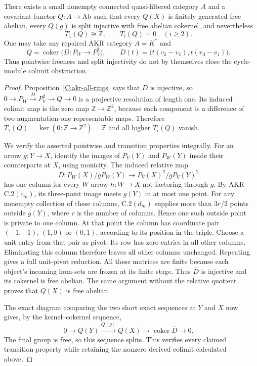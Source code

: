 \begin{proposition}\label{C:split-monic-counterexample}
There exists a small nonempty connected quasi-filtered category $A$
and a covariant functor $Q:A\to\mathrm{Ab}$ such that every $Q(X)$ is
finitely generated free abelian, every $Q(g)$ is split injective with
free abelian cokernel, and nevertheless
\[
 T_1(Q)\cong\mathbb Z,\qquad T_i(Q)=0\quad(i\geq2).
\]
One may take any repaired AKR category $A=K^*$ and
\[
 Q=\operatorname{coker}\bigl(D:P_W\longrightarrow P_V^2\bigr),
 \qquad D(t)=\bigl(t(v_2-v_1),t(v_3-v_1)\bigr).
\]
Thus pointwise freeness and split injectivity do not by themselves
close the cycle-module colimit obstruction.
\end{proposition}
\begin{proof}
Proposition~\ref{C:akr-all-rings} says that $D$ is injective, so
$0\to P_W\xrightarrow D P_V^2\to Q\to0$ is a projective resolution
of length one. Its induced colimit map is the zero map
$\mathbb Z\to\mathbb Z^2$, because each component is a difference
of two augmentation-one representable maps. Therefore
$T_1(Q)=\ker(0:\mathbb Z\to\mathbb Z^2)=\mathbb Z$ and all higher
$T_i(Q)$ vanish.

We verify the asserted pointwise and transition properties integrally.
For an arrow $g:Y\to X$, identify the images of $P_V(Y)$ and
$P_W(Y)$ inside their counterparts at $X$, using monicity. The induced
relative map
\[
 \overline D:
 P_W(X)/gP_W(Y)\longrightarrow
 P_V(X)^2/gP_V(Y)^2
\]
has one column for every $W$-arrow $h:W\to X$ not factoring through
$g$. By AKR C.2$(c_m)$, its three-point image meets $g(Y)$ in at most
one point. For any nonempty collection of these columns,
C.2$(d_m)$ supplies more than $3r/2$ points outside $g(Y)$, where $r$
is the number of columns. Hence one such outside point is private to
one column. At that point the column has coordinate pair
$(-1,-1)$, $(1,0)$ or $(0,1)$, according to its position in the triple.
Choose a unit entry from that pair as pivot. Its row has zero entries
in all other columns. Eliminating this column therefore leaves all
other columns unchanged. Repeating gives a full unit-pivot reduction.
All these matrices are finite because each object's incoming hom-sets
are frozen at its finite stage. Thus $\overline D$ is injective and
its cokernel is free abelian. The same argument without the relative
quotient proves that $Q(X)$ is free abelian.

The exact diagram comparing the two short exact sequences at $Y$
and $X$ now gives, by the kernel--cokernel sequence,
\[
 0\longrightarrow Q(Y)\xrightarrow{Q(g)}Q(X)
 \longrightarrow\operatorname{coker}\overline D\longrightarrow0.
\]
The final group is free, so this sequence splits. This verifies every
claimed transition property while retaining the nonzero derived
colimit calculated above.
\end{proof}

